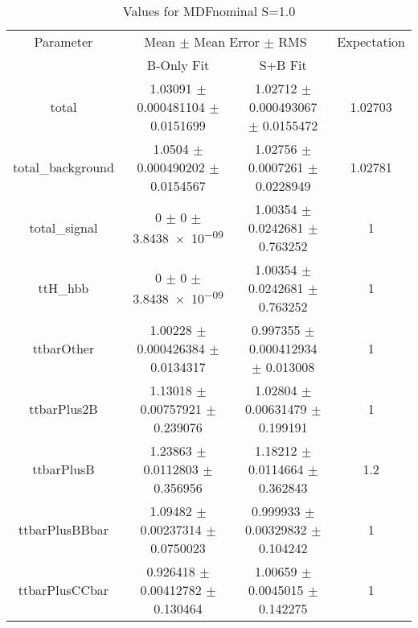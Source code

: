 \begin{table}
\centering
\caption{Values for MDFnominal S=1.0}
\begin{tabular}{cccc}
\toprule
Parameter & \multicolumn{2}{c}{Mean $\pm$ Mean Error $\pm$ RMS} & Expectation\\
 & B-Only Fit & S+B Fit & \\
\midrule
total & \num{1.03091} $\pm$ \num{0.000481104} $\pm$ \num{0.0151699} & \num{1.02712} $\pm$ \num{0.000493067} $\pm$ \num{0.0155472} & \num{1.02703}\\
total\_background & \num{1.0504} $\pm$ \num{0.000490202} $\pm$ \num{0.0154567} & \num{1.02756} $\pm$ \num{0.0007261} $\pm$ \num{0.0228949} & \num{1.02781}\\
total\_signal & \num{0} $\pm$ \num{0} $\pm$ \num{3.8438e-09} & \num{1.00354} $\pm$ \num{0.0242681} $\pm$ \num{0.763252} & \num{1}\\
ttH\_hbb & \num{0} $\pm$ \num{0} $\pm$ \num{3.8438e-09} & \num{1.00354} $\pm$ \num{0.0242681} $\pm$ \num{0.763252} & \num{1}\\
ttbarOther & \num{1.00228} $\pm$ \num{0.000426384} $\pm$ \num{0.0134317} & \num{0.997355} $\pm$ \num{0.000412934} $\pm$ \num{0.013008} & \num{1}\\
ttbarPlus2B & \num{1.13018} $\pm$ \num{0.00757921} $\pm$ \num{0.239076} & \num{1.02804} $\pm$ \num{0.00631479} $\pm$ \num{0.199191} & \num{1}\\
ttbarPlusB & \num{1.23863} $\pm$ \num{0.0112803} $\pm$ \num{0.356956} & \num{1.18212} $\pm$ \num{0.0114664} $\pm$ \num{0.362843} & \num{1.2}\\
ttbarPlusBBbar & \num{1.09482} $\pm$ \num{0.00237314} $\pm$ \num{0.0750023} & \num{0.999933} $\pm$ \num{0.00329832} $\pm$ \num{0.104242} & \num{1}\\
ttbarPlusCCbar & \num{0.926418} $\pm$ \num{0.00412782} $\pm$ \num{0.130464} & \num{1.00659} $\pm$ \num{0.0045015} $\pm$ \num{0.142275} & \num{1}\\
\bottomrule
\end{tabular}
\end{table}